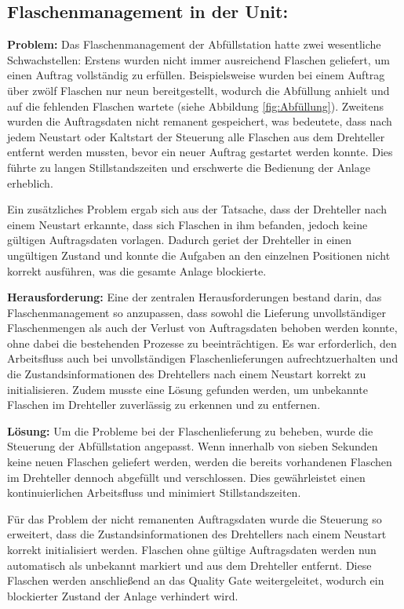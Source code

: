 \subsection{Flaschenmanagement in der Unit:}

\textbf{Problem:}  
Das Flaschenmanagement der Abfüllstation hatte zwei wesentliche Schwachstellen: Erstens wurden nicht immer ausreichend Flaschen geliefert, 
um einen Auftrag vollständig zu erfüllen. Beispielsweise wurden bei einem Auftrag über zwölf Flaschen nur neun bereitgestellt, wodurch die 
Abfüllung anhielt und auf die fehlenden Flaschen wartete (siehe Abbildung \ref{fig:Abfüllung}). Zweitens wurden die Auftragsdaten nicht remanent 
gespeichert, was bedeutete, dass nach jedem Neustart oder Kaltstart der Steuerung alle Flaschen aus dem Drehteller entfernt werden mussten, bevor 
ein neuer Auftrag gestartet werden konnte. Dies führte zu langen Stillstandszeiten und erschwerte die Bedienung der Anlage erheblich.  

Ein zusätzliches Problem ergab sich aus der Tatsache, dass der Drehteller nach einem Neustart erkannte, dass sich Flaschen in ihm befanden, 
jedoch keine gültigen Auftragsdaten vorlagen. Dadurch geriet der Drehteller in einen ungültigen Zustand und konnte die Aufgaben an den einzelnen 
Positionen nicht korrekt ausführen, was die gesamte Anlage blockierte.  

\textbf{Herausforderung:}  
Eine der zentralen Herausforderungen bestand darin, das Flaschenmanagement so anzupassen, dass sowohl die Lieferung unvollständiger 
Flaschenmengen als auch der Verlust von Auftragsdaten behoben werden konnte, ohne dabei die bestehenden Prozesse zu beeinträchtigen. 
Es war erforderlich, den Arbeitsfluss auch bei unvollständigen Flaschenlieferungen aufrechtzuerhalten und die Zustandsinformationen des 
Drehtellers nach einem Neustart korrekt zu initialisieren. Zudem musste eine Lösung gefunden werden, um unbekannte Flaschen im Drehteller 
zuverlässig zu erkennen und zu entfernen.  

\textbf{Lösung:}  
Um die Probleme bei der Flaschenlieferung zu beheben, wurde die Steuerung der Abfüllstation angepasst. Wenn innerhalb von sieben Sekunden 
keine neuen Flaschen geliefert werden, werden die bereits vorhandenen Flaschen im Drehteller dennoch abgefüllt und verschlossen. Dies gewährleistet einen kontinuierlichen Arbeitsfluss und minimiert Stillstandszeiten.  

Für das Problem der nicht remanenten Auftragsdaten wurde die Steuerung so erweitert, dass die Zustandsinformationen des Drehtellers nach 
einem Neustart korrekt initialisiert werden. Flaschen ohne gültige Auftragsdaten werden nun automatisch als unbekannt markiert und aus dem Drehteller entfernt. Diese Flaschen werden anschließend an das Quality Gate weitergeleitet, wodurch ein blockierter Zustand der Anlage verhindert wird.  

